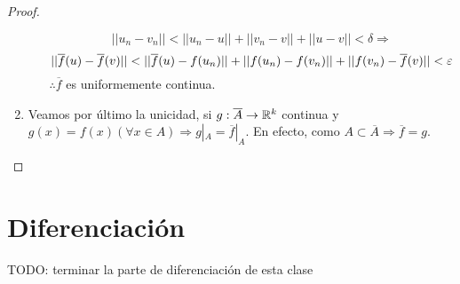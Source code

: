\begin{theorem}
\begin{proof}
\begin{enumerate}
\begin{enumerate}
\begin{equation}
          ||u_n - v_n|| < ||u_n - u|| + ||v_n - v|| + ||u - v|| < \delta \Rightarrow
        \end{equation}
        \begin{equation}
          ||\overline{f}(u) - \overline{f}(v)|| < ||\overline{f}(u) - f(u_n)|| + ||f(u_n) - f(v_n)|| + ||f(v_n) - \overline{f}(v)|| < \varepsilon
        \end{equation} $\therefore \overline{f}$ es uniformemente continua.
      \end{enumerate}
      \item Veamos por último la unicidad, si $g: \overline{A} \to \mathbb{R}^k$ continua y $g(x) = f(x) (\forall x \in A) \Rightarrow g|_A = \overline{f}|_A$. En efecto, como $A \subset \overline{A} \Rightarrow \overline{f} = g$. 
    \end{enumerate}
  \end{proof}
\end{theorem}

\section{Diferenciación}
TODO: terminar la parte de diferenciación de esta clase
